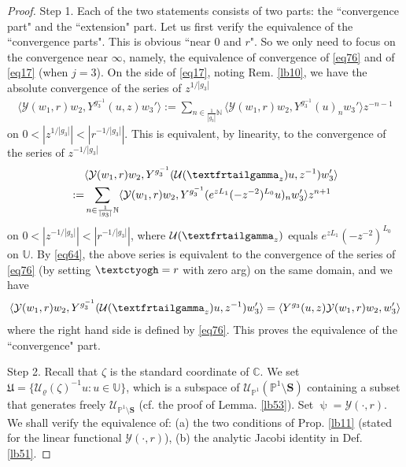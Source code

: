 \documentclass[11pt,b5paper,notitlepage]{article}
\theoremstyle{definition}
\theoremstyle{plain}
\newcommand{\fk}{\mathfrak}
\newcommand{\mc}{\mathcal}
\newcommand{\bk}[1]{\langle {#1}\rangle}
\newcommand{\scr}{\mathscr}
\newcommand{\Ubb}{\mathbb U}
\newcommand{\Cbb}{\mathbb C}
\newcommand{\Nbb}{\mathbb N}
\newcommand{\Pbb}{\mathbb P}
\newcommand{\Sbf}{\mathbf{S}}
\newcommand{\tipaz}{\text{\textctyogh}}
\newcommand{\tipxgamma}{\text{\textfrtailgamma}}
\numberwithin{equation}{subsection}
\begin{document}
\begin{proof}
Step 1. Each of the two statements consists of two parts: the ``convergence part" and the ``extension" part. Let us first verify the equivalence of the ``convergence parts". This is obvious ``near $0$ and $r$". So we only need to focus on the convergence  near $\infty$, namely, the equivalence of convergence of \eqref{eq76} and of \eqref{eq17} (when $j=3$). On the side of \eqref{eq17}, noting Rem. \ref{lb10}, we have the absolute  convergence of the series of $z^{1/|g_3|}$
\begin{align*}
\bk{\mc Y(w_1,r)w_2,Y^{g_3^{-1}}(u,z)w_3'}:=\sum_{n\in\frac 1{|g_3|}\Nbb}	\bk{\mc Y(w_1,r)w_2,Y^{g_3^{-1}}(u)_nw_3'}z^{-n-1}	
\end{align*}
on $0<|z^{1/|g_3|}|<|r^{-1/|g_3|}|$. This is equivalent, by linearity, to the convergence  of the series of $z^{-1/|g_3|}$
\begin{align*}
&\bk{\mc Y(w_1,r)w_2,Y^{g_3^{-1}}(\mc U(\tipxgamma_z)u,z^{-1})w_3'}\\
:=&\sum_{n\in\frac 1{|g_3|}\Nbb}	\bk{\mc Y(w_1,r)w_2,Y^{g_3^{-1}}(e^{zL_1}(-z^{-2})^{L_0}u)_nw_3'}z^{n+1}	
\end{align*}
on $0<|z^{-1/|g_3|}|<|r^{-1/|g_3|}|$, where $\mc U(\tipxgamma_z)$ equals $e^{zL_1}(-z^{-2})^{L_0}$ on $\Ubb$. By \eqref{eq64}, the above series is equivalent to the convergence of the series of \eqref{eq76} (by setting $\tipaz=r$ with zero arg) on the same domain, and we have
\begin{align}
\bk{\mc Y(w_1,r)w_2,Y^{g_3^{-1}}(\mc U(\tipxgamma_z)u,z^{-1})w_3'}=	\bk{Y^{g_3}(u,z)\mc Y(w_1,r)w_2,w_3'}\label{eq83}
\end{align}
where the right hand side is defined by \eqref{eq76}. This proves the equivalence of the ``convergence" part.

Step 2. Recall that $\zeta$ is the standard coordinate of $\Cbb$. We set $\fk U=\{\mc U_\varrho(\zeta)^{-1}u:u\in\Ubb\}$, which is a subspace of $\scr U_{\Pbb^1}(\Pbb^1\setminus\Sbf)$ containing a subset that generates freely $\scr U_{\Pbb^1\setminus\Sbf}$ (cf. the proof of Lemma. \ref{lb53}). Set $\uppsi=\mc Y(\cdot,r)$. We shall verify the equivalence of: (a) the two conditions of Prop. \ref{lb11} (stated for the linear functional $\mc Y(\cdot,r)$), (b) the analytic Jacobi identity in Def. \ref{lb51}.


\end{proof}
\end{document}
